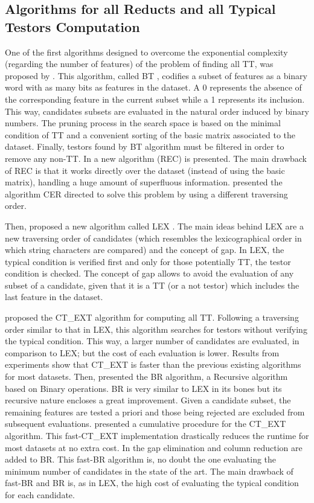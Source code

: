 \documentclass[authoryear,11pt]{elsarticle}
\makeatletter
\newcommand{\setword}[2]{%
  \phantomsection
  #1\def\@currentlabel{\unexpanded{#1}}\label{#2}%
}
\makeatother
\begin{document}
  \subsection{Algorithms for all Reducts and all Typical Testors Computation}
  One of the first algorithms designed to overcome the exponential complexity (regarding
  the number of features) of the problem of finding all TT, was 
  proposed by \cite{Ruiz85}. This algorithm, called \setword{BT}{BT},
  codifies a subset of features as a binary word with as many bits as features in the 
  dataset. A 0 represents the absence of the corresponding feature in the current
  subset while a 1 represents its inclusion. This way, candidates subsets are evaluated
  in the natural order induced by binary numbers. The pruning process in the
  search space is based on the minimal condition of TT and a convenient sorting
  of the basic matrix associated to the dataset. Finally, 
  testors found by BT algorithm must be filtered in order to remove any non-TT.
  In \citep{Shulcloper95b} a new algorithm (REC) is presented.
  The main drawback of REC is that it works directly over the dataset (instead of using the
  basic matrix), handling a huge amount of superfluous information. \cite{Ayaquica97}
  presented the algorithm CER directed to solve this problem by using a different traversing
  order. 
	
  Then, \cite{Santiesteban03} proposed a new algorithm called \setword{LEX}{LEX}. The main ideas 
  behind LEX are a new traversing order of candidates (which resembles the
  lexicographical order in which string characters are compared) and the concept of gap. In LEX,
  the typical condition is verified first and only for those potentially TT, the testor 
  condition is checked. 
  The concept of gap allows to avoid the evaluation of any subset of a candidate, given that it is
  a TT (or a not testor) which includes the last feature in the dataset.
	
  \cite{Sanchez07} proposed the \setword{CT\_EXT}{CTEXT} algorithm for computing all
  TT. Following a traversing order similar to that in LEX, this algorithm searches for
  testors without verifying the typical condition. This way, a larger number of candidates are 
  evaluated, in comparison to LEX; but the cost of each evaluation is lower. Results from experiments
  show that CT\_EXT is faster than the previous existing algorithms for most datasets. Then, \cite{Lias09}
  presented the \setword{BR}{BR} algorithm, a Recursive algorithm based on 
  Binary operations. BR is very similar to LEX in its bones but its recursive nature encloses a great
  improvement. Given a candidate subset, the remaining features are tested a priori and those being 
  rejected are excluded from subsequent evaluations. \cite{Sanchez10} presented a cumulative
  procedure for the CT\_EXT algorithm. This fast-CT\_EXT implementation drastically reduces the runtime
  for most datasets at no extra cost. In \citep{Lias13} the
  gap elimination and column reduction are added to BR. This fast-BR algorithm is, no doubt the one 
  evaluating the minimum number of candidates in the state of the art. The main drawback of fast-BR and 
  BR is, as in LEX, the high cost of evaluating the typical condition for each candidate. 
\end{document}
